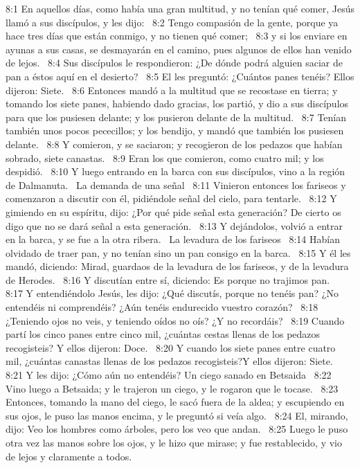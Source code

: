 8:1 En aquellos días, como había una gran multitud, y no tenían qué comer, Jesús llamó a sus discípulos, y les dijo:  
8:2 Tengo compasión de la gente, porque ya hace tres días que están conmigo, y no tienen qué comer;  
8:3 y si los enviare en ayunas a sus casas, se desmayarán en el camino, pues algunos de ellos han venido de lejos.  
8:4 Sus discípulos le respondieron: ¿De dónde podrá alguien saciar de pan a éstos aquí en el desierto?  
8:5 El les preguntó: ¿Cuántos panes tenéis? Ellos dijeron: Siete.  
8:6 Entonces mandó a la multitud que se recostase en tierra; y tomando los siete panes, habiendo dado gracias, los partió, y dio a sus discípulos para que los pusiesen delante; y los pusieron delante de la multitud.  
8:7 Tenían también unos pocos pececillos; y los bendijo, y mandó que también los pusiesen delante.  
8:8 Y comieron, y se saciaron; y recogieron de los pedazos que habían sobrado, siete canastas.  
8:9 Eran los que comieron, como cuatro mil; y los despidió.  
8:10 Y luego entrando en la barca con sus discípulos, vino a la región de Dalmanuta.  
La demanda de una señal   
8:11 Vinieron entonces los fariseos y comenzaron a discutir con él, pidiéndole señal del cielo, para tentarle.  
8:12 Y gimiendo en su espíritu, dijo: ¿Por qué pide señal esta generación? De cierto os digo que no se dará señal a esta generación.  
8:13 Y dejándolos, volvió a entrar en la barca, y se fue a la otra ribera.  
La levadura de los fariseos   
8:14 Habían olvidado de traer pan, y no tenían sino un pan consigo en la barca.  
8:15 Y él les mandó, diciendo: Mirad, guardaos de la levadura de los fariseos, y de la levadura de Herodes.  
8:16 Y discutían entre sí, diciendo: Es porque no trajimos pan.  
8:17 Y entendiéndolo Jesús, les dijo: ¿Qué discutís, porque no tenéis pan? ¿No entendéis ni comprendéis? ¿Aún tenéis endurecido vuestro corazón?  
8:18 ¿Teniendo ojos no veis, y teniendo oídos no oís? ¿Y no recordáis?  
8:19 Cuando partí los cinco panes entre cinco mil, ¿cuántas cestas llenas de los pedazos recogisteis? Y ellos dijeron: Doce.  
8:20 Y cuando los siete panes entre cuatro mil, ¿cuántas canastas llenas de los pedazos recogisteis?Y ellos dijeron: Siete.  
8:21 Y les dijo: ¿Cómo aún no entendéis? 
Un ciego sanado en Betsaida  
8:22 Vino luego a Betsaida; y le trajeron un ciego, y le rogaron que le tocase.  
8:23 Entonces, tomando la mano del ciego, le sacó fuera de la aldea; y escupiendo en sus ojos, le puso las manos encima, y le preguntó si veía algo.  
8:24 El, mirando, dijo: Veo los hombres como árboles, pero los veo que andan.  
8:25 Luego le puso otra vez las manos sobre los ojos, y le hizo que mirase; y fue restablecido, y vio de lejos y claramente a todos.  
